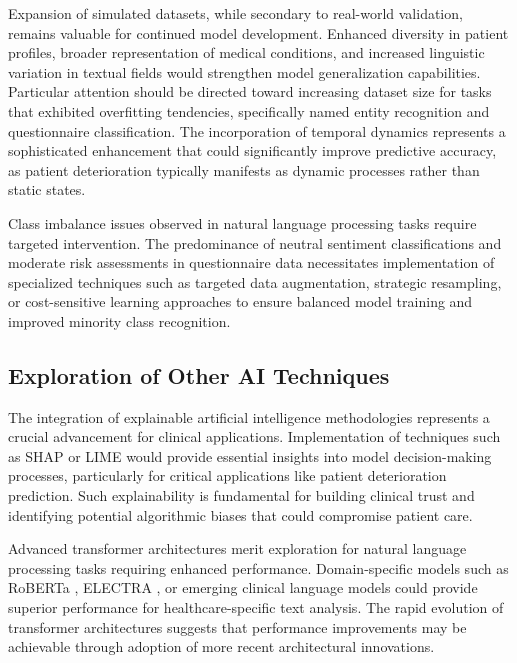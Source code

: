 Expansion of simulated datasets, while secondary to real-world validation, remains valuable for continued model development. Enhanced diversity in patient profiles, broader representation of medical conditions, and increased linguistic variation in textual fields would strengthen model generalization capabilities. Particular attention should be directed toward increasing dataset size for tasks that exhibited overfitting tendencies, specifically named entity recognition and questionnaire classification. The incorporation of temporal dynamics represents a sophisticated enhancement that could significantly improve predictive accuracy, as patient deterioration typically manifests as dynamic processes rather than static states.

Class imbalance issues observed in natural language processing tasks require targeted intervention. The predominance of neutral sentiment classifications and moderate risk assessments in questionnaire data necessitates implementation of specialized techniques such as targeted data augmentation, strategic resampling, or cost-sensitive learning approaches to ensure balanced model training and improved minority class recognition.

\subsection{Exploration of Other AI Techniques}

The integration of explainable artificial intelligence methodologies represents a crucial advancement for clinical applications. Implementation of techniques such as SHAP or LIME \parencite{lundberg2017unifiedapproachinterpretingmodel} would provide essential insights into model decision-making processes, particularly for critical applications like patient deterioration prediction. Such explainability is fundamental for building clinical trust and identifying potential algorithmic biases that could compromise patient care.

Advanced transformer architectures merit exploration for natural language processing tasks requiring enhanced performance. Domain-specific models such as RoBERTa \parencite{liu2019robertarobustlyoptimizedbert}, ELECTRA \parencite{clark2020electrapretrainingtextencoders}, or emerging clinical language models could provide superior performance for healthcare-specific text analysis. The rapid evolution of transformer architectures suggests that performance improvements may be achievable through adoption of more recent architectural innovations.

